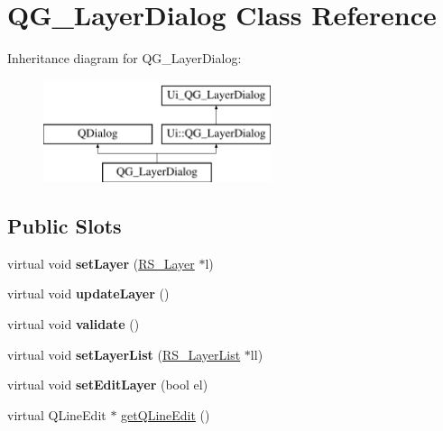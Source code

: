 \hypertarget{classQG__LayerDialog}{\section{Q\-G\-\_\-\-Layer\-Dialog Class Reference}
\label{classQG__LayerDialog}
}
Inheritance diagram for Q\-G\-\_\-\-Layer\-Dialog\-:\begin{figure}[H]
\begin{center}
\leavevmode
\includegraphics[height=3.000000cm]{classQG__LayerDialog}
\end{center}
\end{figure}
\subsection*{Public Slots}
\begin{DoxyCompactItemize}
\item 
\hypertarget{classQG__LayerDialog_a79e624076c538208094cf58f9801c391}{virtual void {\bfseries set\-Layer} (\hyperlink{classRS__Layer}{R\-S\-\_\-\-Layer} $\ast$l)}\label{classQG__LayerDialog_a79e624076c538208094cf58f9801c391}

\item 
\hypertarget{classQG__LayerDialog_a5969d6f1d4f9b1773cf57a2b1c38cc23}{virtual void {\bfseries update\-Layer} ()}\label{classQG__LayerDialog_a5969d6f1d4f9b1773cf57a2b1c38cc23}

\item 
\hypertarget{classQG__LayerDialog_a757850ef2f7d2178011bd81b9102c951}{virtual void {\bfseries validate} ()}\label{classQG__LayerDialog_a757850ef2f7d2178011bd81b9102c951}

\item 
\hypertarget{classQG__LayerDialog_a2dbc3c13a1dc2e11d4c5fb55f4c21c53}{virtual void {\bfseries set\-Layer\-List} (\hyperlink{classRS__LayerList}{R\-S\-\_\-\-Layer\-List} $\ast$ll)}\label{classQG__LayerDialog_a2dbc3c13a1dc2e11d4c5fb55f4c21c53}

\item 
\hypertarget{classQG__LayerDialog_af9acb6c1bee26da4680a3a9a2fcaaa04}{virtual void {\bfseries set\-Edit\-Layer} (bool el)}\label{classQG__LayerDialog_af9acb6c1bee26da4680a3a9a2fcaaa04}

\item 
virtual Q\-Line\-Edit $\ast$ \hyperlink{classQG__LayerDialog_aad2ec41fc3d92a1f5e03126dad5f04c6}{get\-Q\-Line\-Edit} ()
\end{DoxyCompactItemize}
